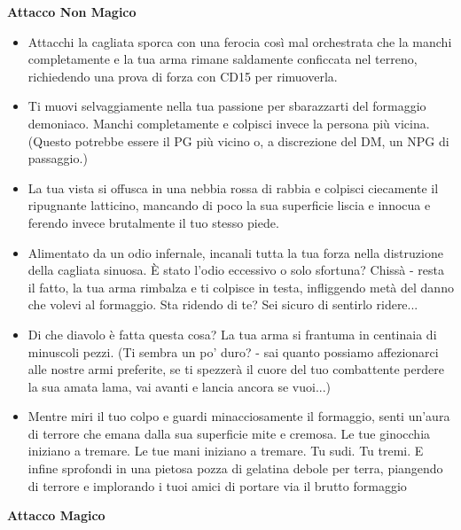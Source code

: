 \documentclass{article}
\begin{document}
\textbf{Attacco Non Magico}
\begin{itemize}
    \item  Attacchi la cagliata sporca con una ferocia così mal orchestrata che la manchi completamente e la tua arma rimane saldamente conficcata nel terreno, richiedendo una prova di forza con CD15 per rimuoverla.
    \item Ti muovi selvaggiamente nella tua passione per sbarazzarti del formaggio demoniaco. Manchi completamente e colpisci invece la persona più vicina. (Questo potrebbe essere il PG più vicino o, a discrezione del DM, un NPG di passaggio.)
    \item La tua vista si offusca in una nebbia rossa di rabbia e colpisci ciecamente il ripugnante latticino, mancando di poco la sua superficie liscia e innocua e ferendo invece brutalmente il tuo stesso piede.
    \item Alimentato da un odio infernale, incanali tutta la tua forza nella distruzione della cagliata sinuosa. È stato l’odio eccessivo o solo sfortuna? Chissà - resta il fatto, la tua arma rimbalza e ti colpisce in testa, infliggendo metà del danno che volevi al formaggio. Sta ridendo di te? Sei sicuro di sentirlo ridere...
    \item Di che diavolo è fatta questa cosa? La tua arma si frantuma in centinaia di minuscoli pezzi. (Ti sembra un po' duro? - sai quanto possiamo affezionarci alle nostre armi preferite, se ti spezzerà il cuore del tuo combattente perdere la sua amata lama, vai avanti e lancia ancora se vuoi...)
    \item Mentre miri il tuo colpo e guardi minacciosamente il formaggio, senti un'aura di terrore che emana dalla sua superficie mite e cremosa. Le tue ginocchia iniziano a tremare. Le tue mani iniziano a tremare. Tu sudi. Tu tremi. E infine sprofondi in una pietosa pozza di gelatina debole per terra, piangendo di terrore e implorando i tuoi amici di portare via il brutto formaggio
\end{itemize}
\textbf{Attacco Magico}
\end{document}
